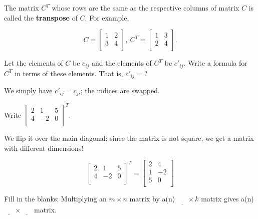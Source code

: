\documentclass[../key.tex]{subfiles}
\begin{document}
\begin{outer_problem}
\item The matrix $C^T$ whose rows are the same as the respective columns of matrix $C$ is called the \textbf{transpose} of $C$. For example,

$$C=\left[\begin{array}{cc}
1 & 2 \\
3 & 4 \\
\end{array}\right],\: C^T=\left[\begin{array}{cc}
1 & 3 \\
2 & 4 \\
\end{array}\right].$$
\end{outer_problem}

\begin{inner_problem}[start=1]
\item Let the elements of $C$ be $c_{ij}$ and the elements of $C^T$ be $c'_{ij}$. Write a formula for $C^T$ in terms of these elements. That is, $c'_{ij} = $?
\end{inner_problem}

We simply have $c'_{ij} = c_{ji}$; the indices are swapped.

\begin{inner_problem}
\item Write $\left[\begin{array}{ccc}
2 & 1 & 5 \\
4 & -2 & 0 \\
\end{array}\right]^T$.
\end{inner_problem}

We flip it over the main diagonal; since the matrix is not square, we get a matrix with different dimensions!

$$\left[\begin{array}{ccc}
2 & 1 & 5 \\
4 & -2 & 0 \\
\end{array}\right]^T = \begin{bmatrix}
2 & 4 \\
1 & -2 \\
5 & 0 \\
\end{bmatrix}$$

\begin{outer_problem}
\item Fill in the blanks: Multiplying an $m\times n$ matrix by a(n) $\underline{\phantom{egg}} \times k$ matrix gives a(n) $\underline{\phantom{egg}}\times\underline{\phantom{egg}}$ matrix.
\end{outer_problem}
\end{document}
